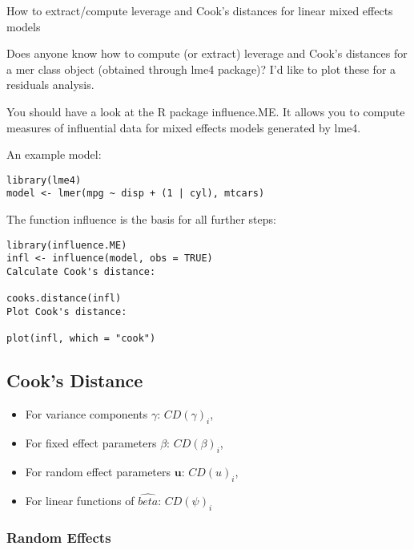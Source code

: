 \documentclass[12pt, a4paper]{article}
\begin{document}

How to extract/compute leverage and Cook's distances for linear mixed effects models

Does anyone know how to compute (or extract) leverage and Cook's distances for a mer class object (obtained through lme4 package)? I'd like to plot these for a residuals analysis.

You should have a look at the R package influence.ME. It allows you to compute measures of influential data for mixed effects models generated by lme4.

An example model:

\begin{verbatim}
library(lme4)
model <- lmer(mpg ~ disp + (1 | cyl), mtcars)
\end{verbatim}

The function influence is the basis for all further steps:

\begin{verbatim}
library(influence.ME)
infl <- influence(model, obs = TRUE)
Calculate Cook's distance:

cooks.distance(infl)
Plot Cook's distance:

plot(infl, which = "cook")
\end{verbatim}


\subsection{Cook's Distance}
\begin{itemize}
	\item For variance components $\gamma$: $CD(\gamma)_i$,
	\item For fixed effect parameters $\beta$: $CD(\beta)_i$,
	\item For random effect parameters $\boldsymbol{u}$: $CD(u)_i$,
	\item For linear functions of $\hat{beta}$: $CD(\psi)_i$
\end{itemize}



\subsubsection{Random Effects}
\end{document}
